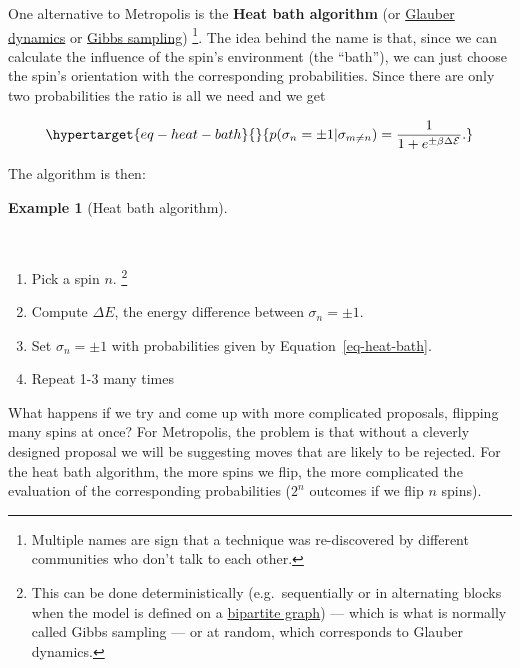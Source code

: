 \documentclass[
  letterpaper,
  DIV=11,
  numbers=noendperiod]{scrreprt}
\providecommand{\tightlist}{%
  \setlength{\itemsep}{0pt}\setlength{\parskip}{0pt}}\usepackage{longtable,booktabs,array}
\theoremstyle{definition}
\newtheorem{example}{Example}[chapter]
\theoremstyle{remark}
\begin{document}
One alternative to Metropolis is the \textbf{Heat bath algorithm} (or
\href{https://en.wikipedia.org/wiki/Glauber_dynamics}{Glauber dynamics}
or \href{https://en.wikipedia.org/wiki/Gibbs_sampling}{Gibbs sampling})
\footnote{Multiple names are sign that a technique was re-discovered by
  different communities who don't talk to each other.}. The idea behind
the name is that, since we can calculate the influence of the spin's
environment (the ``bath''), we can just choose the spin's orientation
with the corresponding probabilities. Since there are only two
probabilities the ratio is all we need and we get

\begin{equation}\protect\hypertarget{eq-heat-bath}{}{
p(\sigma_n=\pm 1|\sigma_{m\neq n}) = \frac{1}{1+ e^{\pm\beta \Delta \mathcal{E}}}.
}\label{eq-heat-bath}\end{equation}

The algorithm is then:

\leavevmode{}%
\begin{example}[Heat bath algorithm]\label{exm-heat-bath}

~

\begin{enumerate}
\def\labelenumi{\arabic{enumi}.}
\tightlist
\item
  Pick a spin \(n\). \footnote{This can be done deterministically
    (e.g.~sequentially or in alternating blocks when the model is
    defined on a
    \href{https://en.wikipedia.org/wiki/Bipartite_graph}{bipartite
    graph}) --- which is what is normally called Gibbs sampling --- or
    at random, which corresponds to Glauber dynamics.}
\item
  Compute \(\Delta E\), the energy difference between
  \(\sigma_n=\pm 1\).
\item
  Set \(\sigma_n=\pm 1\) with probabilities given by
  Equation~\ref{eq-heat-bath}.
\item
  Repeat 1-3 many times
\end{enumerate}

\end{example}

What happens if we try and come up with more complicated proposals,
flipping many spins at once? For Metropolis, the problem is that without
a cleverly designed proposal we will be suggesting moves that are likely
to be rejected. For the heat bath algorithm, the more spins we flip, the
more complicated the evaluation of the corresponding probabilities
(\(2^n\) outcomes if we flip \(n\) spins).
\end{document}
